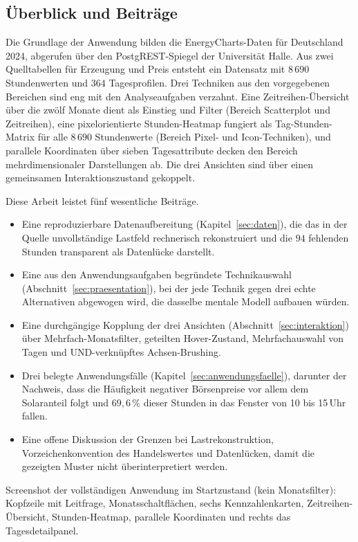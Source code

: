 \subsection{Überblick und Beiträge}

Die Grundlage der Anwendung bilden die EnergyCharts-Daten \cite{EnergyCharts} für Deutschland 2024,
abgerufen über den PostgREST-Spiegel der Universität Halle. Aus zwei Quelltabellen für Erzeugung und Preis
entsteht ein Datensatz mit $8\,690$ Stundenwerten und $364$ Tagesprofilen. Drei Techniken aus den vorgegebenen
Bereichen sind eng mit den Analyseaufgaben verzahnt. Eine Zeitreihen-Übersicht über die zwölf Monate dient als
Einstieg und Filter (Bereich Scatterplot und Zeitreihen), eine pixelorientierte Stunden-Heatmap fungiert als
Tag-Stunden-Matrix für alle $8\,690$ Stundenwerte (Bereich Pixel- und Icon-Techniken), und parallele
Koordinaten über sieben Tagesattribute decken den Bereich mehrdimensionaler Darstellungen ab. Die drei
Ansichten sind über einen gemeinsamen Interaktionszustand gekoppelt.

Diese Arbeit leistet fünf wesentliche Beiträge.

\begin{itemize}
  \item[\textbf{B1}] Eine reproduzierbare Datenaufbereitung (Kapitel~\ref{sec:daten}), die
        das in der Quelle unvollständige Lastfeld rechnerisch rekonstruiert und die $94$ fehlenden
        Stunden transparent als Datenlücke darstellt.
  \item[\textbf{B2}] Eine aus den Anwendungsaufgaben begründete Technikauswahl
        (Abschnitt~\ref{sec:praesentation}), bei der jede Technik gegen drei echte Alternativen
        abgewogen wird, die dasselbe mentale Modell aufbauen würden.
  \item[\textbf{B3}] Eine durchgängige Kopplung der drei Ansichten
        (Abschnitt~\ref{sec:interaktion}) über Mehrfach-Monatsfilter, geteilten Hover-Zustand,
        Mehrfachauswahl von Tagen und UND-verknüpftes Achsen-Brushing.
  \item[\textbf{B4}] Drei belegte Anwendungsfälle (Kapitel~\ref{sec:anwendungsfaelle}),
        darunter der Nachweis, dass die Häufigkeit negativer Börsenpreise vor allem dem
        Solaranteil folgt und $69{,}6\,\%$ dieser Stunden in das Fenster von 10 bis 15\,Uhr fallen.
  \item[\textbf{B5}] Eine offene Diskussion der Grenzen bei Lastrekonstruktion,
        Vorzeichenkonvention des Handelswertes und Datenlücken, damit die gezeigten Muster nicht
        überinterpretiert werden.
\end{itemize}

{Screenshot der vollständigen Anwendung im Startzustand (kein Monatsfilter): Kopfzeile mit
Leitfrage, Monatsschaltflächen, sechs Kennzahlenkarten, Zeitreihen-Übersicht, Stunden-Heatmap,
parallele Koordinaten und rechts das Tagesdetailpanel.}
